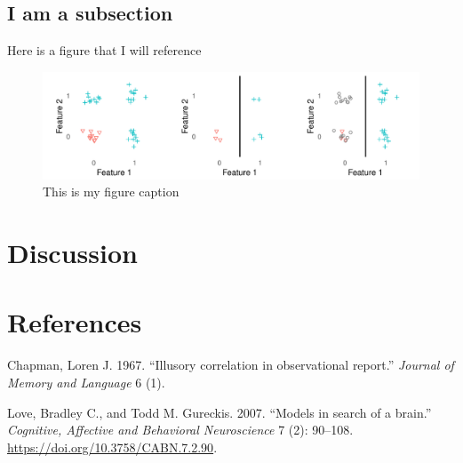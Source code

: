 \documentclass[
]{article}
\begin{document}
\hypertarget{i-am-a-subsection}{%
\subsection{I am a subsection}\label{i-am-a-subsection}}

Here is a figure that I will reference

\begin{figure}
\centering
\includegraphics{figures/learning_trap.pdf}
\caption{This is my figure caption\label{fig:learning_trap}}
\end{figure}

\hypertarget{discussion}{%
\section{Discussion}\label{discussion}}

\hypertarget{references}{%
\section*{References}\label{references}}

\hypertarget{refs}{}
\leavevmode\hypertarget{ref-Chapman1967}{}%
Chapman, Loren J. 1967. ``Illusory correlation in observational
report.'' \emph{Journal of Memory and Language} 6 (1).

\leavevmode\hypertarget{ref-Love2007}{}%
Love, Bradley C., and Todd M. Gureckis. 2007. ``Models in search of a
brain.'' \emph{Cognitive, Affective and Behavioral Neuroscience} 7 (2):
90--108. \url{https://doi.org/10.3758/CABN.7.2.90}.
\end{document}
